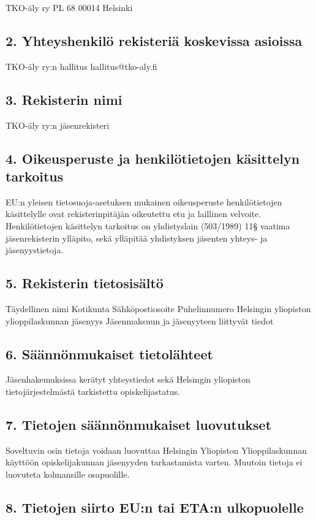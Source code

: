 \documentclass[finnish]{tktltiki}
\begin{document}
TKO-äly ry
PL 68
00014 Helsinki
\subsection*{2. Yhteyshenkilö rekisteriä koskevissa asioissa}

TKO-äly ry:n hallitus
hallitus@tko-aly.fi
\subsection*{3. Rekisterin nimi}

TKO-äly ry:n jäsenrekisteri
\subsection*{4. Oikeusperuste ja henkilötietojen käsittelyn tarkoitus}

EU:n yleisen tietosuoja-asetuksen mukainen oikeusperuste henkilötietojen käsittelylle ovat
rekisterinpitäjän oikeutettu etu ja laillinen velvoite.
Henkilötietojen käsittelyn tarkoitus on yhdistyslain (503/1989) 11§ vaatima jäsenrekisterin
ylläpito, sekä ylläpitää yhdistyksen jäsenten yhteys- ja jäsenyystietoja.

\subsection*{5. Rekisterin tietosisältö}
Täydellinen nimi
Kotikunta
Sähköpostiosoite
Puhelinnumero
Helsingin yliopiston ylioppilaskunnan jäsenyys
Jäsenmaksuun ja jäsenyyteen liittyvät tiedot

\subsection*{6. Säännönmukaiset tietolähteet}
Jäsenhakemuksissa kerätyt yhteystiedot sekä Helsingin yliopiston tietojärjestelmästä tarkistettu opiskelijastatus.

\subsection*{7. Tietojen säännönmukaiset luovutukset}

Soveltuvin osin tietoja voidaan luovuttaa Helsingin Yliopiston Ylioppilaskunnan käyttöön opiskelijakunnan jäsenyyden tarkastamista varten. Muutoin tietoja ei luovuteta kolmansille osapuolille.
\subsection*{8. Tietojen siirto EU:n tai ETA:n ulkopuolelle}
\end{document}
